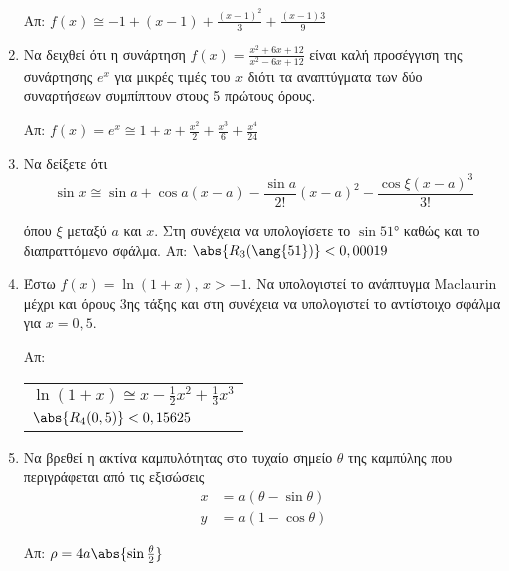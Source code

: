 \begin{enumerate}
		\hfill Απ: $f(x) \cong -1 + (x-1) + \frac{(x-1)^{2}}{3} +
		\frac{(x-1){3}}{9}$

	\item Να δειχθεί ότι η συνάρτηση $ f(x) = \frac{x^{2} + 6x + 12}{x^{2} - 6x
		+ 12} $ είναι καλή προσέγγιση της συνάρτησης $ e^{x} $ για μικρές τιμές
		του $x$ διότι τα αναπτύγματα των δύο συναρτήσεων συμπίπτουν στους 5
		πρώτους όρους. 

		\hfill Απ: $ f(x) = e^{x} \cong 1 + x + \frac{x^{2}}{2} +
		\frac{x^{3}}{6} + \frac{x^{4}}{24} $

	\item Να δείξετε ότι 
		\[
			\sin{x} \cong \sin{a} + \cos{a} (x-a) - \frac{\sin{a}}{2!} (x-a)^{2} -
			\frac{\cos{\xi} (x-a)^{3}}{3!}
		\]

		όπου $\xi$ μεταξύ $a$ και $x$. Στη συνέχεια να υπολογίσετε το $
		\sin{\ang{51}}$ καθώς και το διαπραττόμενο σφάλμα.
		\hfill Απ: $ \abs{R_{3}(\ang{51})} < 0,00019 $

	\item Έστω $ f(x) = \ln{(1+x)} $, $ x>-1 $. Να υπολογιστεί το ανάπτυγμα
		\textlatin{Maclaurin} μέχρι και όρους 3ης τάξης και στη συνέχεια να
		υπολογιστεί το αντίστοιχο σφάλμα για $ x = 0,5 $.

		\hfill Απ: \begin{tabular}{l}
			$ \ln(1+x) \cong x - \frac{1}{2} x^{2} + \frac{1}{3}x^{3} $ \\
			$ \abs{R_{4}(0,5)} < 0,15625 $	
		\end{tabular}

	\item Να βρεθεί η ακτίνα καμπυλότητας στο τυχαίο σημείο $\theta$ της
		καμπύλης που περιγράφεται από τις εξισώσεις 
		\begin{align*}
			x &= a(\theta - \sin{\theta}) \\
			y &= a(1 - \cos{\theta})
		\end{align*}		

		\hfill Απ: $ \rho = 4a \abs{\sin{\frac{\theta}{2}}} $
\end{enumerate}



